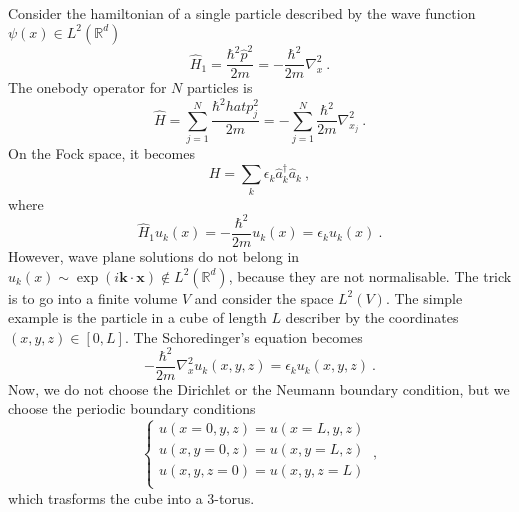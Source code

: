    Consider the hamiltonian of a single particle described by the wave function $\psi (x) \in L^2 (\mathbb R^d)$ 
    \begin{equation*}
        \hat H_1 = \frac{\hbar^2 \hat p^2}{2m} = - \frac{\hbar^2}{2m} \nabla_x^2 ~.
    \end{equation*}
    The onebody operator for $N$ particles is 
    \begin{equation*}
        \hat H = \sum_{j = 1}^{N} \frac{\hbar^2 hat p_j^2}{2m} = - \sum_{j = 1}^{N} \frac{\hbar^2}{2m} \nabla^2_{x_j} ~.
    \end{equation*}
    On the Fock space, it becomes 
    \begin{equation*}
        H = \sum_k \epsilon_k \hat a_k^\dagger \hat a_k ~,
    \end{equation*}
    where 
    \begin{equation*}
        \hat H_1 u_k (x) = - \frac{\hbar^2}{2m} u_k (x) = \epsilon_k u_k (x) ~.
    \end{equation*}
    However, wave plane solutions do not belong in $u_k(x) \sim \exp(i \mathbf k \cdot \mathbf x) \notin L^2 (\mathbb R^d)$, because they are not normalisable. The trick is to go into a finite volume $V$ and consider the space $L^2(V)$. The simple example is the particle in a cube of length $L$ describer by the coordinates $(x,y,z) \in [0, L]$. The Schoredinger's equation becomes 
    \begin{equation*}
        - \frac{\hbar^2}{2m} \nabla_x^2 u_k (x,y,z) = \epsilon_k u_k (x,y,z) ~.
    \end{equation*}
    Now, we do not choose the Dirichlet or the Neumann boundary condition, but we choose the periodic boundary conditions 
    \begin{equation*}
        \begin{cases}
            u(x=0, y, z) = u(x = L, y, z) \\
            u(x, y=0, z) = u(x, y=L, z) \\
            u(x, y, z=0) = u(x, y, z=L) \\
        \end{cases} ~,
    \end{equation*}
    which trasforms the cube into a $3$-torus.

